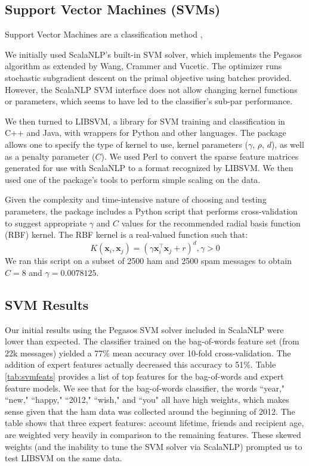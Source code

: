 \documentclass[preprint]{acm_proc_article-sp}
\begin{document}
\subsection{Support Vector Machines (SVMs)}


Support Vector Machines are a classification method \cite{boser}, \cite{cortesv95} 

We initially used ScalaNLP's built-in SVM solver, which implements the Pegasos algorithm \cite{pegasos} as extended 
by Wang, Crammer and Vucetic\cite{wang2}. The optimizer runs stochastic subgradient descent on the primal objective 
using batches provided. However, the ScalaNLP SVM interface does not allow changing kernel functions or parameters, 
which seems to have led to the classifier's sub-par performance.

We then turned to LIBSVM, a library for SVM training and classification in C++ and Java, with wrappers for 
Python and other languages. The package allows one to specify the type of kernel to use, kernel parameters 
($\gamma$, $\rho$, $d$), as well as a penalty parameter ($C$). We used Perl to convert the sparse feature 
matrices generated for use with ScalaNLP to a format recognized by LIBSVM. We then used one of the package's 
tools to perform simple scaling on the data. 

Given the complexity and time-intensive nature of choosing and testing parameters, the 
package includes a Python script that performs cross-validation to suggest appropriate 
$\gamma$ and $C$ values for the recommended radial basis function (RBF) kernel. The RBF kernel is 
a real-valued function such that: 
$$K(\mathbf{x}_i, \mathbf{x}_j) = (\gamma\mathbf{x}_i^\intercal\mathbf{x}_j+r)^d, \gamma>0$$
We ran this script on a subset of 2500 ham and 2500 spam messages to obtain $C = 8$ and $\gamma = 0.0078125$.


\subsection{SVM Results}

Our initial results using the Pegasos SVM solver included in ScalaNLP were lower than expected. The 
classifier trained on the bag-of-words feature set (from 22k messages) yielded a 77\% mean accuracy 
over 10-fold cross-validation. The addition of expert features actually decreased this accuracy to 
51\%. Table \ref{tab:svmfeats} provides a list of top features for the bag-of-words and expert 
feature models. We see that for the bag-of-words classifier, the words ``year," ``new," ``happy,"  
``2012," ``wish," and ``you" all have high weights, which makes sense given that the ham data was 
collected around the beginning of 2012. The table shows that three expert features: account lifetime, 
friends and recipient age, are weighted very heavily in comparison to the remaining features. These 
skewed weights (and the inability to tune the SVM solver via ScalaNLP) prompted us to test LIBSVM 
on the same data.
\end{document}
